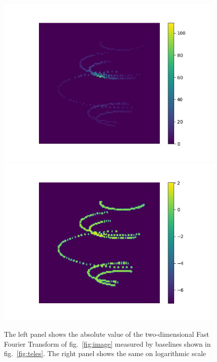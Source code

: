 \begin{figure}
		\includegraphics[width=.49\linewidth]{fig/ft/ft_base.jpg}\hfil
		\includegraphics[width=.49\linewidth]{fig/ft/ft_log_base.jpg}
	\caption{The left panel shows the absolute value of the two-dimensional Fast Fourier Transform of fig.~\ref{fig:image} measured by baselines shown in fig.~\ref{fig:teles}. The right panel shows the same on logarithmic scale}
	\label{fig:ft_base}
\end{figure}
